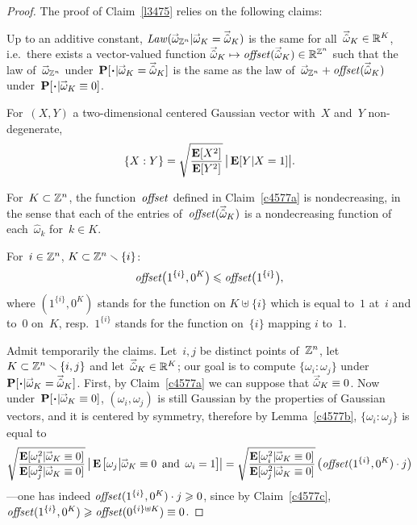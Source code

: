 \begin{proof}
The proof of Claim~\ref{l3475} relies on the following claims:
\begin{Clm}\label{c4577a}
Up to an additive constant, $\Law(\vec\omega_{\ZZ^n}|\vec\omega_K=\vechat{\omega}_K)$
is the same for all~$\vechat{\omega}_K \in \RR^K$, i.e.\ there exists a vector-valued function
$\vechat{\omega}_K \mapsto \offset(\vechat{\omega}_K) \in \RR^{\ZZ^n}$
such that the law of~$\vec\omega_{\ZZ^n}$ under~$\Pr[\Bcdot|\ab {\vec\omega_K=\vechat{\omega}_K}]$
is the same as the law of~$\vec\omega_{\ZZ^n} + \offset(\vechat{\omega}_K)$
under~$\Pr[\Bcdot|\ab {\vec\omega_K \equiv 0}]$.
\end{Clm}

\begin{Lem}\label{c4577b}
For~$(X,Y)$ a two-dimensional centered Gaussian vector with~$X$ and~$Y$ non-degenerate,
\[\label{f5223} \{X:Y\} = \sqrt{\frac{\EE[X^2]}{\EE[Y^2]}} \, \big|\EE[Y|X=1]\big| .\]
\end{Lem}

\begin{Clm}\label{c4577c}
For~$K\subset\mathbb{Z}^n$, the function~$\mathit{offset}$
defined in Claim~\ref{c4577a} is nondecreasing,
in the sense that each of the entries of~$\offset(\vechat{\omega}_K)$
is a nondecreasing function of each~$\hat\omega_k$ for~$k\in K$.
\end{Clm}

\begin{Clm}\label{c4577d}
For~$i\in\mathbb{Z}^n$, $K\subset\mathbb{Z}^n\smallsetminus\{i\}$:
\[ \offset\big(1^{\{i\}},0^K\big) \leq \offset\big(1^{\{i\}}\big) ,\]
where $(1^{\{i\}},0^K)$ stands for the function on
$K\uplus\{i\}$ which is equal to~$1$ at~$i$ and to~$0$ on~$K$,
resp.~$1^{\{i\}}$ stands for the function on~$\{i\}$ mapping $i$ to~$1$.
\end{Clm}

Admit temporarily the claims.
Let~$i,j$ be distinct points of~$\mathbb{Z}^n$, let~$K\subset\mathbb{Z}^n\smallsetminus\{i,j\}$
and let~$\vechat{\omega}_K \in \RR^K$; our goal is to compute
$\{ \omega_i : \omega_j \}$ under~$\Pr[\Bcdot|\ab \vec\omega_K=\vechat{\omega}_K]$.
First, by Claim~\ref{c4577a} we can suppose that $\vechat{\omega}_K \equiv 0$.
Now under~$\Pr[\Bcdot|\ab \vec\omega_K\equiv0]$, $(\omega_i,\omega_j)$ is still Gaussian
by the properties of Gaussian vectors, and it is centered by symmetry,
therefore by Lemma~\ref{c4577b}, $\{\omega_i:\omega_j\}$ is equal to
\[\label{f5276}
\sqrt{\frac{\EE[\omega_i^2|\vec\omega_K\equiv0]}{\EE[\omega_j^2|\vec\omega_K\equiv0]}} \, \big| \EE\big[\omega_j\big|\vec\omega_K\equiv0\enskip\text{and}\enskip \omega_i=1\big] \big|
= \sqrt{\frac{\EE[\omega_i^2|\vec\omega_K\equiv0]}{\EE[\omega_j^2|\vec\omega_K\equiv0]}} \, \big(\offset(1^{\{i\}},0^K)\cdot j\big) \]
—one has indeed $\mathit{offset}(1^{\{i\}},0^K)\cdot j \geqslant 0$,
since by Claim~\ref{c4577c}, $\mathit{offset}(1^{\{i\}},0^K) \geqslant \mathit{offset}(0^{\{i\}\uplus K}) \equiv 0$.


\end{proof}
